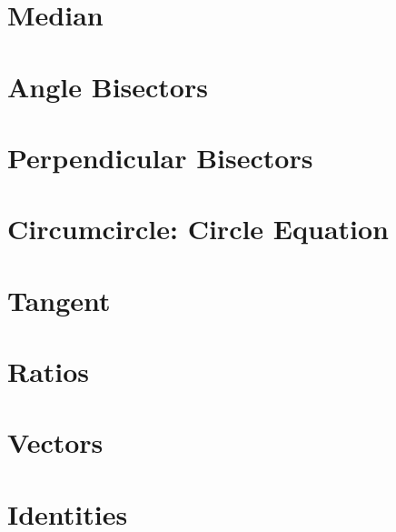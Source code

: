 \documentclass[journal]{IEEEtran}
\begin{document}
\section{Median}

\section{Angle Bisectors}

\section{Perpendicular Bisectors}

\section{Circumcircle: Circle Equation}

\section{Tangent}

%
\appendices
\section{Ratios}

\section{Vectors}

\section{Identities}

%
\end{document}
